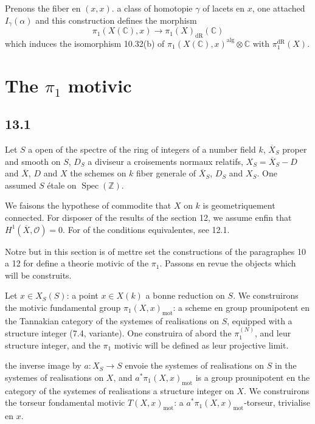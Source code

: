 \documentclass[12pt,a4paper]{article}
\theoremstyle{plain}
\theoremstyle{definition}
\theoremstyle{remark}
\DeclareMathOperator{\Spec}{Spec}
\newcommand{\cO}{\mathcal{O}}
\newcommand{\bZ}{\mathbb{Z}}
\newcommand{\bC}{\mathbb{C}}
\newcommand{\dr}{\mathrm{dR}}
\newcommand{\mot}{\mathrm{mot}}
\begin{document}
Prenons the fiber en $(x,x)$. a class of homotopie $\gamma$ of lacets en $x$, one attached $I_\gamma(\alpha)$ and this construction defines the morphism
\begin{equation}\label{eq:12.16.1}
\pi_1(X(\bC), x) \to \pi_1(X)_{\dr}(\bC)
\end{equation}
which induces the isomorphism 10.32(b) of $\pi_1(X(\bC),x)^{\text{alg}} \otimes \bC$ with $\pi_1^{\dr}(X)$.


\section{The $\pi_1$ motivic}\label{sec:13}

\subsection*{13.1}

Let $S$ a open of the spectre of the ring of integers of a number field $k$, $\overline{X}_S$ proper and smooth on $S$, $D_S$ a diviseur a croisements normaux relatifs, $X_S = \overline{X}_S - D$ and $\overline{X}$, $D$ and $X$ the schemes on $k$ fiber generale of $\overline{X}_S$, $D_S$ and $X_S$. One assumed $S$ étale on $\Spec(\bZ)$.

We faisons the hypothese of commodite that $X$ on $k$ is geometriquement connected. For disposer of the results of the section 12, we assume enfin that $H^1(\overline{X}, \cO) = 0$. For of the conditions equivalentes, see 12.1.

Notre but in this section is of mettre set the constructions of the paragraphes 10 a 12 for define a theorie motivic of the $\pi_1$. Passons en revue the objects which will be construits.

Let $x \in X_S(S)$: a point $x \in X(k)$ a bonne reduction on $S$. We construirons the motivic fundamental group $\pi_1(X,x)_{\mot}$: a scheme en group prounipotent en the Tannakian category of the systemes of realisations on $S$, equipped with a structure integer (7.4, variante). One construira of abord the $\pi_1^{(N)}$, and leur structure integer, and the $\pi_1$ motivic will be defined as leur projective limit.

the inverse image by $a : X_S \to S$ envoie the systemes of realisations on $S$ in the systemes of realisations on $X$, and $a^* \pi_1(X,x)_{\mot}$ is a group prounipotent en the category of the systemes of realisations a structure integer on $X$. We construirons the torseur fondamental motivic $T(X,x)_{\mot}$: a $a^* \pi_1(X,x)_{\mot}$-torseur, trivialise en $x$.
\end{document}
